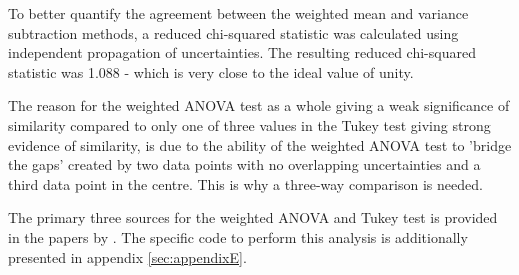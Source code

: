 To better quantify the agreement between the weighted mean and variance subtraction methods, a reduced chi-squared statistic was calculated using independent propagation of uncertainties. The resulting reduced chi-squared statistic was 1.088 - which is very close to the ideal value of unity.


The reason for the weighted ANOVA test as a whole giving a weak significance of similarity compared to only one of three values in the Tukey test giving strong evidence of similarity, is due to the ability of the weighted ANOVA test to 'bridge the gaps' created by two data points with no overlapping uncertainties and a third data point in the centre. This is why a three-way comparison is needed.


The primary three sources for the weighted ANOVA and Tukey test is provided in the papers by \cite{ID76, ID77, ID78}. The specific code to perform this analysis is additionally presented in appendix \ref{sec:appendixE}.


